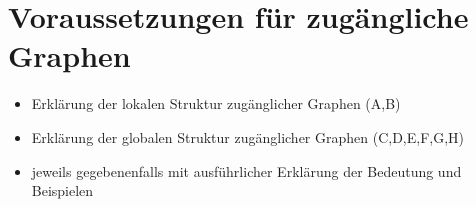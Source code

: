 \section{Voraussetzungen für zugängliche Graphen}

\begin{itemize}
	\item Erklärung der lokalen Struktur zugänglicher Graphen (A,B)
	\item Erklärung der globalen Struktur zugänglicher Graphen (C,D,E,F,G,H)
	\item jeweils gegebenenfalls mit ausführlicher Erklärung der Bedeutung und Beispielen
\end{itemize}